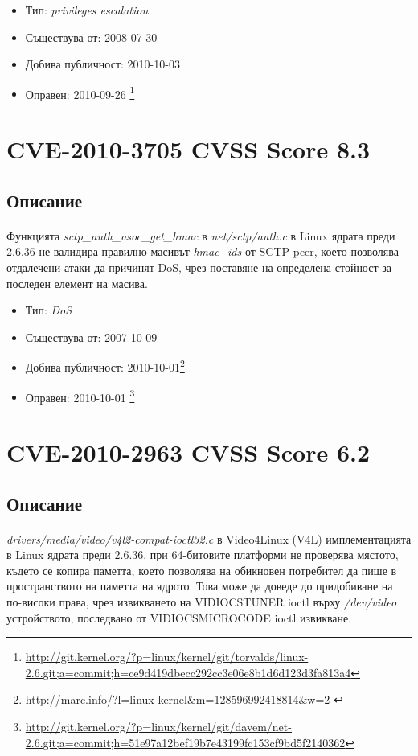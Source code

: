 \documentclass[a4paper,12pt,leqno]{article}
\begin{document}
\begin{itemize}
    \item Тип: \textit{privileges escalation}
    \item Съществува от: 2008-07-30
  	\item Добива публичност: 2010-10-03
    \item Оправен: 2010-09-26 \footnote{\url{http://git.kernel.org/?p=linux/kernel/git/torvalds/linux-2.6.git;a=commit;h=ce9d419dbecc292cc3e06e8b1d6d123d3fa813a4}}
\end{itemize}


\section{CVE-2010-3705 CVSS Score 8.3}
\subsection{Описание}
\paragraph{}
Функцията \textit{sctp\_auth\_asoc\_get\_hmac} в\textit{ net/sctp/auth.c} в Linux ядрата преди 2.6.36 не валидира правилно масивът \textit{hmac\_ids} от SCTP peer, което позволява отдалечени атаки да причинят DoS, чрез поставяне на определена стойност за последен елемент на масива.

\begin{itemize}
    \item Тип: \textit{DoS}
    \item Съществува от: 2007-10-09
  	\item Добива публичност: 2010-10-01\footnote{\url{http://marc.info/?l=linux-kernel&m=128596992418814&w=2	}}
    \item Оправен: 2010-10-01 \footnote{\url{http://git.kernel.org/?p=linux/kernel/git/davem/net-2.6.git;a=commit;h=51e97a12bef19b7e43199fc153cf9bd5f2140362}}
\end{itemize}


\section{CVE-2010-2963 CVSS Score 6.2}
\subsection{Описание}
\paragraph{}
\textit{drivers/media/video/v4l2-compat-ioctl32.c} в Video4Linux (V4L) имплементацията в Linux ядрата преди 2.6.36, при 64-битовите платформи не проверява мястото, където се копира паметта, което позволява на обикновен потребител да пише в пространството на паметта на ядрото. Това може да доведе до придобиване на по-високи права, чрез извикването на VIDIOCSTUNER ioctl върху \textit{/dev/video} устройството, последвано от VIDIOCSMICROCODE ioctl извикване.
\end{document}

